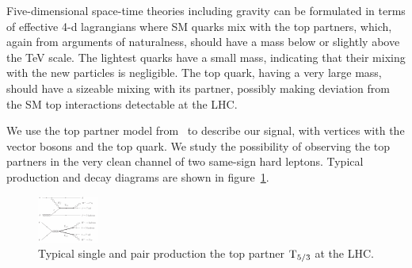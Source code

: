Five-dimensional space-time theories including gravity can be formulated in
terms of effective 4-d lagrangians where SM quarks mix with the top
partners, which, again from arguments of naturalness, should have a mass below or
slightly above the \unit[]{TeV} scale.
The lightest quarks have a small mass, indicating that their mixing with the
new particles is negligible. The top quark, having a very large mass, should have
a sizeable mixing with its partner, possibly making deviation
from the SM top interactions detectable at the LHC.

We use the top partner model from~\cite{Mrazek:2009yu} to describe our
signal, with vertices with the vector bosons and the top quark. 
We study the possibility of observing the top partners in the very clean
channel of two same-sign hard leptons. Typical production and decay diagrams
are shown in figure~\ref{fig:T53_production}.

\begin{figure}[htb]
    \centering
    \includegraphics[width=.7\textwidth]{images/pdf/T53_production}
    \caption{Typical single and pair production the top partner $\mathrm{T}_{5/3}$ at the
    LHC.}
    \label{fig:T53_production}
\end{figure}
